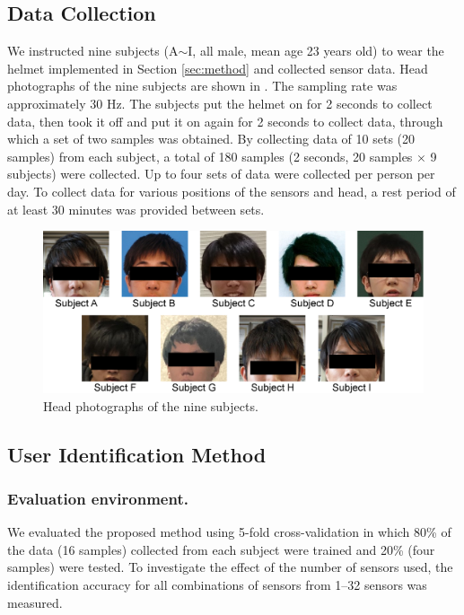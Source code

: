 \documentclass[english,preprint,JIP]{ipsj}
\begin{document}
\subsection{Data Collection}
We instructed nine subjects (A$\sim$I, all male, mean age 23 years old) to wear the helmet implemented in Section \ref{sec:method} and collected sensor data. Head photographs of the nine subjects are shown in . The sampling rate was approximately 30 Hz. The subjects put the helmet on for 2 seconds to collect data, then took it off and put it on again for 2 seconds to collect data, through which a set of two samples was obtained. By collecting data of 10 sets (20 samples) from each subject, a total of 180 samples (2 seconds, 20 samples $\times$ 9 subjects) were collected. Up to four sets of data were collected per person per day. To collect data for various positions of the sensors and head, a rest period of at least 30 minutes was provided between sets.

\begin{figure}[!t]
  \centering
    \includegraphics[width=1\linewidth]{figure/subjects.eps}
  \caption{Head photographs of the nine subjects.}
  \label{fig:subjects}
\end{figure}


\subsection{User Identification Method}


\subsubsection{Evaluation environment.}
We evaluated the proposed method using 5-fold cross-validation in which 80\% of the data (16 samples) collected from each subject were trained and 20\% (four samples) were tested. To investigate the effect of the number of sensors used, the identification accuracy for all combinations of sensors from 1–32 sensors was measured.\par
\end{document}
